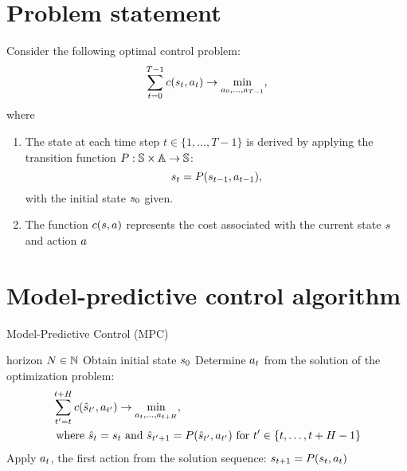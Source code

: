 \documentclass[12pt,twoside]{../../mitthesis}
\begin{document}
\section*{Problem statement}
Consider the following optimal control problem:
$$
    \sum_{t = 0}^{T-1}c(s_{t}, a_{t}) \rightarrow \min_{a_0, \ldots, a_{T-1}},
$$
where
\begin{enumerate}
    \item The state at each time step $t \in \{1, \ldots, T-1\}$ is derived by applying the transition function $P: \mathbb S \times \mathbb A \to \mathbb S$: 
    $$
        s_{t} = P(s_{t-1}, a_{t-1}),
    $$ 
    with the initial state $s_0$ given.
    \item The function $c(s, a)$ represents the cost associated with the current state $s$ and action $a$
\end{enumerate}

\section*{Model-predictive control algorithm}
\begin{algorithm}
    \caption{Model-Predictive Control (MPC)}
    \label{alg:my-alg}
    \begin{algorithmic}[1]
         horizon $N \in {\mathbb{N}}$
        \STATE Obtain initial state $s_0$    
            \STATE Determine $a_t$ from the solution of the optimization problem:
            $$
            \begin{aligned}
                &\sum_{t'=t}^{t+H} c(\hat{s}_{t'}, a_{t'}) \rightarrow \min_{a_t, \dots, a_{t+H}}, \\
                &\text{ where } \hat{s}_t = s_t \text{ and } \hat{s}_{t' + 1} = P(\hat{s}_{t'}, a_{t'}) \text{ for } t' \in \{t, \ldots, t+H-1\}
            \end{aligned}
            $$
            \STATE Apply $a_t$, the first action from the solution sequence: $s_{t+1} = P(s_t, a_t)$
        \ENDFOR
    \end{algorithmic}  
\end{algorithm}
\end{document}
